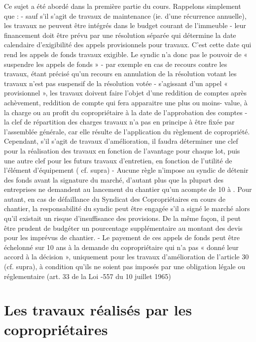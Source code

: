 		Ce sujet a été abordé dans la première partie du cours.
		Rappelons simplement que :
		- sauf s’il s’agit de travaux de maintenance (ie. d’une récurrence annuelle), les travaux ne peuvent être intégrés dans le budget courant de l’immeuble
		- leur financement doit être prévu par une résolution séparée qui détermine la date calendaire d’exigibilité des appels provisionnels pour travaux. C’est cette date qui rend les appels de fonds travaux exigible. Le syndic n’a donc pas le pouvoir de « suspendre les appels de fonds » - par exemple en cas de recours contre les travaux, étant précisé qu’un recours en annulation de la résolution votant les travaux n’est pas suspensif de la résolution votée
		- s’agissant d’un appel « provisionnel », les travaux doivent faire l’objet d’une reddition de comptes après achèvement, reddition de compte qui fera apparaitre une plus ou moins- value, à la charge ou au profit du copropriétaire à la date de l’approbation des comptes
		- la clef de répartition des charges travaux n’a pas en principe à être fixée par l’assemblée générale, car elle résulte de l’application du règlement de copropriété. Cependant, s’il s’agit de travaux d’amélioration, il faudra déterminer une clef pour la réalisation des travaux en fonction de l’avantage pour chaque lot, puis une autre clef pour les futurs travaux d’entretien, en fonction de l’utilité de l’élément d’équipement ( cf. supra)
		- Aucune règle n’impose au syndic de détenir  des fonds avant la signature du marché, d’autant plus que la plupart des entreprises ne demandent au lancement du chantier qu’un acompte de 10 à . Pour autant, en cas de défaillance du Syndicat des Copropriétaires en cours de chantier, la responsabilité du syndic peut être engagée s’il a signé le marché alors qu’il existait un risque d’insuffisance des provisions. De la même façon, il peut être prudent de budgéter un pourcentage supplémentaire au montant des devis pour les imprévus de chantier.
		- Le payement de ces appels de fonds peut être échelonné sur 10 ans à la demande du copropriétaire qui n’a pas « donné leur accord à la décision », uniquement pour les travaux d’amélioration de l’article 30 (cf. supra), à condition qu’ils ne soient pas imposés par une obligation légale ou réglementaire (art. 33 de la Loi -557 du 10 juillet 1965)
	
\section{Les travaux réalisés par les copropriétaires}

